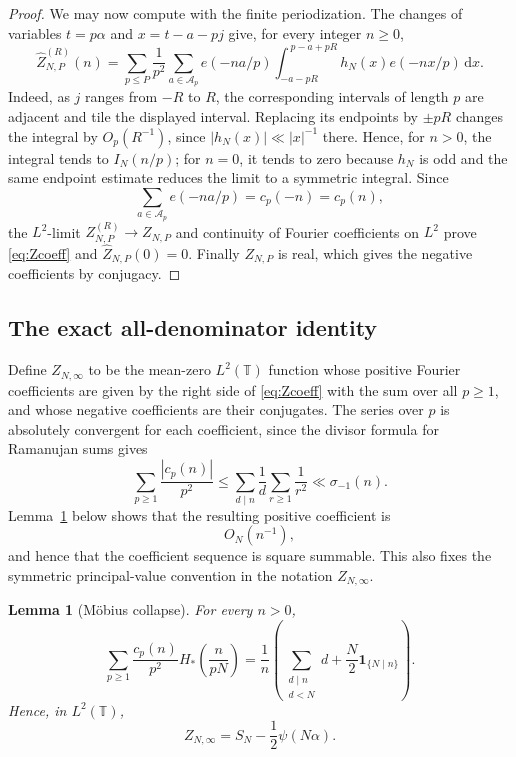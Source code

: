 \documentclass[11pt]{article}
\numberwithin{equation}{section}
\newtheorem{lemma}[theorem]{Lemma}
\theoremstyle{definition}
\newcommand{\T}{\mathbb T}
\newcommand{\1}{\mathbf 1}
\newcommand{\dd}{\,\mathrm d}
\begin{document}
\begin{proof}
We may now compute with the finite periodization.  The changes of
variables \(t=p\alpha\) and \(x=t-a-pj\) give, for every integer \(n\ge0\),
\[
 \widehat Z_{N,P}^{(R)}(n)
 =
 \sum_{p\le P}\frac1{p^2}
 \sum_{a\in\mathcal A_p}e(-na/p)
 \int_{-a-pR}^{\,p-a+pR}h_N(x)e(-nx/p)\dd x.
\]
Indeed, as \(j\) ranges from \(-R\) to \(R\), the corresponding
intervals of length \(p\) are adjacent and tile the displayed interval.
Replacing its endpoints by \(\pm pR\) changes the integral by
\(O_p(R^{-1})\), since \(|h_N(x)|\ll |x|^{-1}\) there.  Hence, for
\(n>0\), the integral tends to \(I_N(n/p)\); for \(n=0\), it tends
to zero because \(h_N\) is odd and the same endpoint estimate reduces
the limit to a symmetric integral.  Since
\[
 \sum_{a\in\mathcal A_p}e(-na/p)=c_p(-n)=c_p(n),
 \]
the \(L^2\)-limit \(Z_{N,P}^{(R)}\to Z_{N,P}\) and continuity of
Fourier coefficients on \(L^2\) prove \eqref{eq:Zcoeff} and
\(\widehat Z_{N,P}(0)=0\).  Finally \(Z_{N,P}\) is real, which gives
the negative coefficients by conjugacy.
\end{proof}


\subsection{The exact all-denominator identity}

Define \(Z_{N,\infty}\) to be the mean-zero \(L^2(\T)\) function whose
positive Fourier coefficients are given by the right side of
\eqref{eq:Zcoeff} with the sum over all \(p\ge1\), and whose negative
coefficients are their conjugates.  The series over \(p\) is absolutely
convergent for each coefficient, since the divisor formula for Ramanujan
sums gives
\[
 \sum_{p\ge1}\frac{|c_p(n)|}{p^2}
 \le \sum_{d\mid n}\frac1d\sum_{r\ge1}\frac1{r^2}
 \ll \sigma_{-1}(n).
\]
Lemma~\ref{lem:collapse} below shows that
the resulting positive coefficient is
\[
 O_N(n^{-1}),
\]
and hence that the coefficient sequence is square summable.  This also fixes the
symmetric principal-value convention in the notation \(Z_{N,\infty}\).

\begin{lemma}[Möbius collapse]\label{lem:collapse}
For every \(n>0\),
\begin{equation}\label{eq:collapse}
 \sum_{p\ge1}\frac{c_p(n)}{p^2}
 H_*\left(\frac{n}{pN}\right)
 =
 \frac1n\left(
 \sum_{\substack{d\mid n\\d<N}}d+
 \frac N2\1_{\{N\mid n\}}\right).
\end{equation}
Hence, in \(L^2(\T)\),
\begin{equation}\label{eq:exactZ}
 Z_{N,\infty}=S_N-\frac12\psi(N\alpha).
\end{equation}
\end{lemma}
\end{document}
